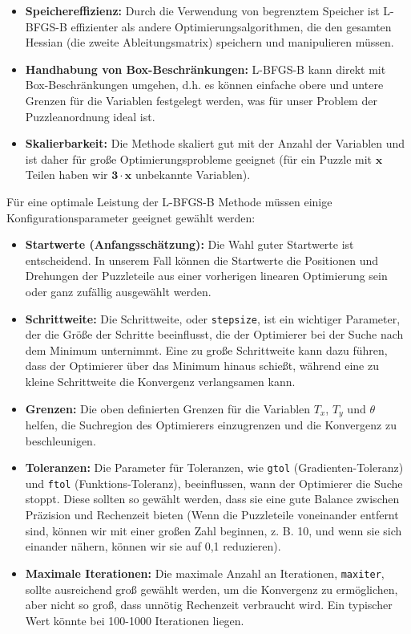 \begin{itemize}
    \item \textbf{Speichereffizienz:} Durch die Verwendung von begrenztem Speicher ist L-BFGS-B effizienter als andere Optimierungsalgorithmen, die den gesamten Hessian (die zweite Ableitungsmatrix) speichern und manipulieren müssen.
    \item \textbf{Handhabung von Box-Beschränkungen:} L-BFGS-B kann direkt mit Box-Beschränkungen umgehen, d.h. es können einfache obere und untere Grenzen für die Variablen festgelegt werden, was für unser Problem der Puzzleanordnung ideal ist.
    \item \textbf{Skalierbarkeit:} Die Methode skaliert gut mit der Anzahl der Variablen und ist daher für große Optimierungsprobleme geeignet (für ein Puzzle mit $\mathbf{x}$ Teilen haben wir $\mathbf{3 \cdot x}$ unbekannte Variablen).
\end{itemize}

Für eine optimale Leistung der L-BFGS-B Methode müssen einige Konfigurationsparameter geeignet gewählt werden:

\begin{itemize}
    \item \textbf{Startwerte (Anfangsschätzung):} Die Wahl guter Startwerte ist entscheidend. In unserem Fall können die Startwerte die Positionen und Drehungen der Puzzleteile aus einer vorherigen linearen Optimierung sein oder ganz zufällig ausgewählt werden.
    \item \textbf{Schrittweite:} Die Schrittweite, oder \texttt{stepsize}, ist ein wichtiger Parameter, der die Größe der Schritte beeinflusst, die der Optimierer bei der Suche nach dem Minimum unternimmt. Eine zu große Schrittweite kann dazu führen, dass der Optimierer über das Minimum hinaus schießt, während eine zu kleine Schrittweite die Konvergenz verlangsamen kann.
    \item \textbf{Grenzen:} Die oben definierten Grenzen für die Variablen $T_x$, $T_y$ und $\theta$ helfen, die Suchregion des Optimierers einzugrenzen und die Konvergenz zu beschleunigen.
    \item \textbf{Toleranzen:} Die Parameter für Toleranzen, wie \texttt{gtol} (Gradienten-Toleranz) und \texttt{ftol} (Funktions-Toleranz), beeinflussen, wann der Optimierer die Suche stoppt. Diese sollten so gewählt werden, dass sie eine gute Balance zwischen Präzision und Rechenzeit bieten (Wenn die Puzzleteile voneinander entfernt sind, können wir mit einer großen Zahl beginnen, z. B. 10, und wenn sie sich einander nähern, können wir sie auf 0,1 reduzieren).
    \item \textbf{Maximale Iterationen:} Die maximale Anzahl an Iterationen, \texttt{maxiter}, sollte ausreichend groß gewählt werden, um die Konvergenz zu ermöglichen, aber nicht so groß, dass unnötig Rechenzeit verbraucht wird. Ein typischer Wert könnte bei 100-1000 Iterationen liegen.
\end{itemize}

